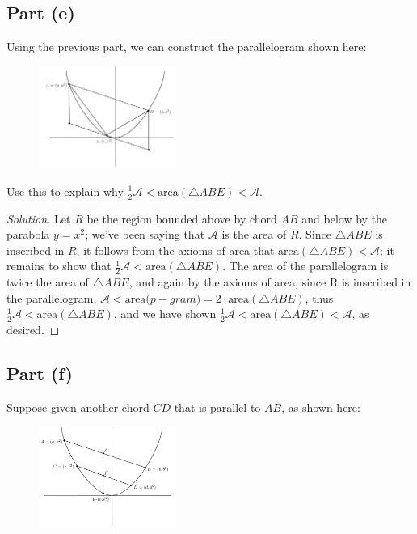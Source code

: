 \documentclass[letterpaper, 12pt]{amsart}
\theoremstyle{definition}  %
\begin{document}
		\subsection*{Part (e)}
		Using the previous part, we can construct the parallelogram shown here:
		\begin{figure}[h]
		\includegraphics[width=0.4\textwidth]{figures/3.png}
		\end{figure}

		Use this to explain why $\frac{1}{2} \mathcal{A} < \text{area}(\triangle ABE) < \mathcal{A}$.

		\begin{proof}[Solution]
		Let $R$ be the region bounded above by chord $AB$ and below by the parabola $y = x^{2}$; we've been saying that $\mathcal{A}$ is the area of $R$.
		Since $\triangle ABE$ is inscribed in $R$, it follows from the axioms of area that $\text{area}(\triangle ABE) < \mathcal{A}$; it remains to show that $\frac{1}{2} \mathcal{A} < \text{area}(\triangle ABE)$.
		The area of the parallelogram is twice the area of $\triangle ABE$, and again by the axioms of area, since R is inscribed in the parallelogram, $\mathcal{A} < \text{area($p-gram$)} = 2 \cdot \text{area}(\triangle ABE)$, thus $\frac{1}{2}\mathcal{A} < \text{area}(\triangle ABE)$, and we have shown $\frac{1}{2} \mathcal{A} < \text{area}(\triangle ABE) < \mathcal{A}$, as desired.
		\end{proof}

		\subsection*{Part (f)}
		Suppose given another chord $CD$ that is parallel to $AB$, as shown here:
		\begin{figure}[h]
		\includegraphics[width=0.4\textwidth]{figures/4.png}
		\end{figure}
\end{document}
